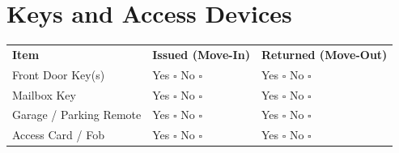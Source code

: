 
\section*{Keys and Access Devices}
\label{sec:keys}

\begin{tabular}{p{6cm} p{5cm} p{5cm}}
\textbf{Item} & \textbf{Issued (Move-In)} & \textbf{Returned (Move-Out)} \\
Front Door Key(s) & Yes $\square$ No $\square$ & Yes $\square$ No $\square$ \\
Mailbox Key & Yes $\square$ No $\square$ & Yes $\square$ No $\square$ \\
Garage / Parking Remote & Yes $\square$ No $\square$ & Yes $\square$ No $\square$ \\
Access Card / Fob & Yes $\square$ No $\square$ & Yes $\square$ No $\square$ \\
\end{tabular}


